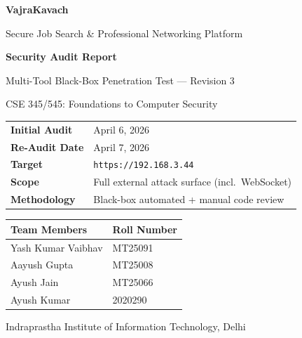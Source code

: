 \documentclass[12pt,a4paper]{article}
\begin{document}
\begin{titlepage}
\centering
\vspace*{2cm}
{\Huge\bfseries\color{primary} VajraKavach\par}
\vspace{0.5cm}
{\Large Secure Job Search \& Professional Networking Platform\par}
\vspace{2cm}
{\LARGE\bfseries Security Audit Report\par}
\vspace{0.3cm}
{\large Multi-Tool Black-Box Penetration Test --- Revision 3\par}
\vspace{0.3cm}
{\large CSE 345/545: Foundations to Computer Security\par}
\vspace{2cm}

\begin{tabular}{ll}
\toprule
\textbf{Initial Audit} & April 6, 2026 \\
\textbf{Re-Audit Date} & April 7, 2026 \\
\textbf{Target} & \texttt{https://192.168.3.44} \\
\textbf{Scope} & Full external attack surface (incl.\ WebSocket) \\
\textbf{Methodology} & Black-box automated + manual code review \\
\bottomrule
\end{tabular}

\vspace{1.5cm}

\begin{tabular}{ll}
\toprule
\textbf{Team Members} & \textbf{Roll Number} \\
\midrule
Yash Kumar Vaibhav & MT25091 \\
Aayush Gupta & MT25008 \\
Ayush Jain & MT25066 \\
Ayush Kumar & 2020290 \\
\bottomrule
\end{tabular}

\vspace{2cm}
{\large Indraprastha Institute of Information Technology, Delhi\par}
\vfill
\end{titlepage}

\tableofcontents
\newpage

\end{document}
